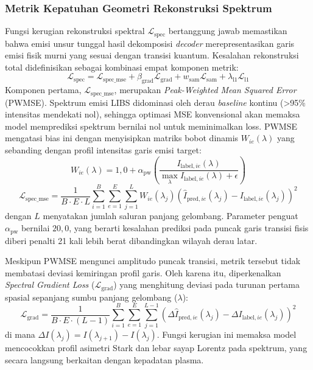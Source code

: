 \subsubsection{Metrik Kepatuhan Geometri Rekonstruksi Spektrum}

Fungsi kerugian rekonstruksi spektral $\mathcal{L}_{\mathrm{spec}}$ bertanggung jawab memastikan bahwa emisi unsur tunggal hasil dekomposisi \textit{decoder} merepresentasikan garis emisi fisik murni yang sesuai dengan transisi kuantum. Kesalahan rekonstruksi total didefinisikan sebagai kombinasi empat komponen metrik:
\begin{equation}
\mathcal{L}_{\mathrm{spec}} = \mathcal{L}_{\mathrm{spec\_mse}} + \beta_{\mathrm{grad}} \mathcal{L}_{\mathrm{grad}} + w_{\mathrm{sam}} \mathcal{L}_{\mathrm{sam}} + \lambda_{\mathrm{l1}} \mathcal{L}_{\mathrm{l1}}
\end{equation}
Komponen pertama, $\mathcal{L}_{\mathrm{spec\_mse}}$, merupakan \textit{Peak-Weighted Mean Squared Error} (PWMSE). Spektrum emisi LIBS didominasi oleh derau \textit{baseline} kontinu (>95\% intensitas mendekati nol), sehingga optimasi MSE konvensional akan memaksa model memprediksi spektrum bernilai nol untuk meminimalkan loss. PWMSE mengatasi bias ini dengan menyisipkan matriks bobot dinamis $W_{ie}(\lambda)$ yang sebanding dengan profil intensitas garis emisi target:
\begin{equation}
W_{ie}(\lambda) = 1{,}0 + \alpha_{\mathrm{pw}} \left( \frac{I_{\mathrm{label}, ie}(\lambda)}{\max_{\lambda} I_{\mathrm{label}, ie}(\lambda) + \epsilon} \right)
\end{equation}
\begin{equation}
\mathcal{L}_{\mathrm{spec\_mse}} = \frac{1}{B \cdot E \cdot L} \sum_{i=1}^{B} \sum_{e=1}^{E} \sum_{j=1}^{L} W_{ie}(\lambda_j) \left( \hat{I}_{\mathrm{pred}, ie}(\lambda_j) - I_{\mathrm{label}, ie}(\lambda_j) \right)^2
\end{equation}
dengan $L$ menyatakan jumlah saluran panjang gelombang. Parameter penguat $\alpha_{\mathrm{pw}}$ bernilai $20{,}0$, yang berarti kesalahan prediksi pada puncak garis transisi fisis diberi penalti 21 kali lebih berat dibandingkan wilayah derau latar.

Meskipun PWMSE mengunci amplitudo puncak transisi, metrik tersebut tidak membatasi deviasi kemiringan profil garis. Oleh karena itu, diperkenalkan \textit{Spectral Gradient Loss} ($\mathcal{L}_{\mathrm{grad}}$) yang menghitung deviasi pada turunan pertama spasial sepanjang sumbu panjang gelombang ($\lambda$):
\begin{equation}
\mathcal{L}_{\mathrm{grad}} = \frac{1}{B \cdot E \cdot (L-1)} \sum_{i=1}^{B} \sum_{e=1}^{E} \sum_{j=1}^{L-1} \left( \Delta \hat{I}_{\mathrm{pred}, ie}(\lambda_j) - \Delta I_{\mathrm{label}, ie}(\lambda_j) \right)^2
\end{equation}
di mana $\Delta I(\lambda_j) = I(\lambda_{j+1}) - I(\lambda_j)$. Fungsi kerugian ini memaksa model mencocokkan profil asimetri Stark dan lebar sayap Lorentz pada spektrum, yang secara langsung berkaitan dengan kepadatan plasma.

